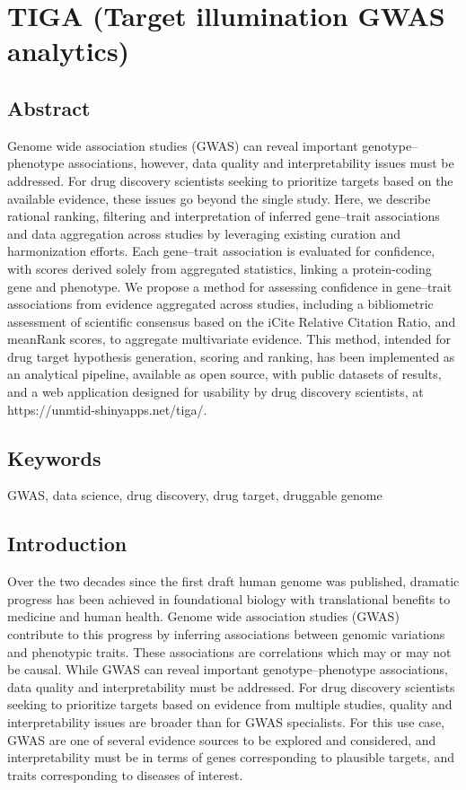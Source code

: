 \chapter{TIGA (Target illumination GWAS analytics)}

\section{Abstract}

Genome wide association studies (GWAS) can reveal important genotype–phenotype associations, however, data quality and interpretability issues must be addressed. For drug discovery scientists seeking to prioritize targets based on the available evidence, these issues go beyond the single study. Here, we describe rational ranking, filtering and interpretation of inferred gene–trait associations and data aggregation across studies by leveraging existing curation and harmonization efforts. Each gene–trait association is evaluated for confidence, with scores derived solely from aggregated statistics, linking a protein-coding gene and phenotype. We propose a method for assessing confidence in gene–trait associations from evidence aggregated across studies, including a bibliometric assessment of scientific consensus based on the iCite Relative Citation Ratio, and meanRank scores, to aggregate multivariate evidence. This method, intended for drug target hypothesis generation, scoring and ranking, has been implemented as an analytical pipeline, available as open source, with public datasets of results, and a web application designed for usability by drug discovery scientists, at https://unmtid-shinyapps.net/tiga/\cite{Yang2021-di}.

\section{Keywords}

GWAS, data science, drug discovery, drug target, druggable genome

\section{Introduction}

Over the two decades since the first draft human genome was published, dramatic progress has been achieved in foundational biology with translational benefits to medicine and human health. Genome wide association studies (GWAS) contribute to this progress by inferring associations between genomic variations and phenotypic traits\cite{Bosse2018-yl,Rusu2017-en}. These associations are correlations which may or may not be causal. While GWAS can reveal important genotype–phenotype associations, data quality and interpretability must be addressed\cite{Lambert2012-tr,Visscher2017-jp,Marigorta2018-xk,Gallagher2018-ev}.  For drug discovery scientists seeking to prioritize targets based on evidence from multiple studies, quality and interpretability issues are broader than for GWAS specialists. For this use case, GWAS are one of several evidence sources to be explored and considered, and interpretability must be in terms of genes corresponding to plausible targets, and traits corresponding to diseases of interest.

